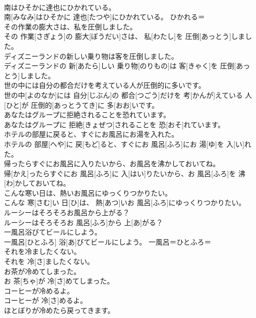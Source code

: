 \documentclass[8pt]{extreport}
\begin{document}
\begin{CJK}{UTF8}{min}
\\	南はひそかに達也にひかれている。	
\\	南[みなみ]はひそかに 達也[たつや]にひかれている。	ひかれる＝ 
\\	その作業の膨大さは、私を圧倒しました。	
\\	その 作業[さぎょう]の 膨大[ぼうだい]さは、 私[わたし]を 圧倒[あっとう]しました。	
\\	ディズニーランドの新しい乗り物は客を圧倒しました。	
\\	ディズニーランドの 新[あたら]しい 乗り物[のりもの]は 客[きゃく]を 圧倒[あっとう]しました。	
\\	世の中には自分の都合だけを考えている人が圧倒的に多いです。	
\\	世の中[よのなか]には 自分[じぶん]の 都合[つごう]だけを 考[かんが]えている 人[ひと]が 圧倒的[あっとうてき]に 多[おお]いです。	
\\	あなたはグループに拒絶されることを恐れています。	
\\	あなたはグループに 拒絶[きょぜつ]されることを 恐[おそ]れています。	
\\	ホテルの部屋に戻ると、すぐにお風呂にお湯を入れた。	
\\	ホテルの 部屋[へや]に 戻[もど]ると、すぐにお 風呂[ふろ]にお 湯[ゆ]を 入[い]れた。	
\\	帰ったらすぐにお風呂に入りたいから、お風呂を沸かしておいてね。	
\\	帰[かえ]ったらすぐにお 風呂[ふろ]に 入[はい]りたいから、お 風呂[ふろ]を 沸[わ]かしておいてね。	
\\	こんな寒い日は、熱いお風呂にゆっくりつかりたい。	
\\	こんな 寒[さむ]い 日[ひ]は、 熱[あつ]いお 風呂[ふろ]にゆっくりつかりたい。	
\\	ルーシーはそろそろお風呂から上がる？	
\\	ルーシーはそろそろお 風呂[ふろ]から 上[あ]がる？	
\\	一風呂浴びてビールにしよう。	
\\	一風呂[ひとふろ] 浴[あ]びてビールにしよう。	一風呂＝ひとふろ＝ 
\\	それを冷ましたくない。	
\\	それを 冷[さ]ましたくない。	
\\	お茶が冷めてしまった。	
\\	お 茶[ちゃ]が 冷[さ]めてしまった。	
\\	コーヒーが冷めるよ。	
\\	コーヒーが 冷[さ]めるよ。	
\\	ほとぼりが冷めたら戻ってきます。	

\end{CJK}
\end{document}
